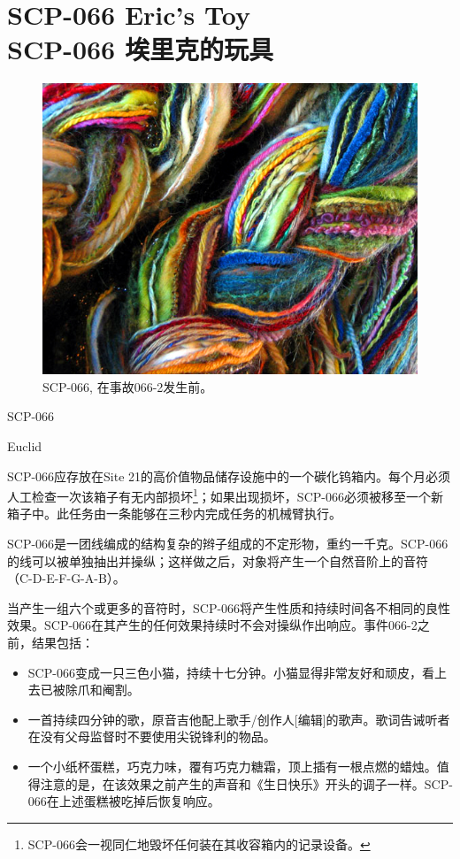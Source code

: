 \chapter[SCP-066 埃里克的玩具]{
    SCP-066 Eric's Toy\\
    SCP-066 埃里克的玩具
}

\label{chap:SCP-066}

\begin{figure}[H]
    \centering
    \includegraphics[width=0.5\linewidth]{images/SCP.066.jpg}
    \caption*{SCP-066, 在事故066-2发生前。}
\end{figure}

SCP-066

 Euclid


SCP-066应存放在Site 21的高价值物品储存设施中的一个碳化钨箱内。每个月必须人工检查一次该箱子有无内部损坏\footnote{SCP-066会一视同仁地毁坏任何装在其收容箱内的记录设备。}；如果出现损坏，SCP-066必须被移至一个新箱子中。此任务由一条能够在三秒内完成任务的机械臂执行。

SCP-066是一团线编成的结构复杂的辫子组成的不定形物，重约一千克。SCP-066的线可以被单独抽出并操纵；这样做之后，对象将产生一个自然音阶上的音符（C-D-E-F-G-A-B）。

当产生一组六个或更多的音符时，SCP-066将产生性质和持续时间各不相同的良性效果。SCP-066在其产生的任何效果持续时不会对操纵作出响应。事件066-2之前，结果包括：

\begin{itemize}
\item SCP-066变成一只三色小猫，持续十七分钟。小猫显得非常友好和顽皮，看上去已被除爪和阉割。
\item 一首持续四分钟的歌，原音吉他配上歌手\slash 创作人{[}编辑]的歌声。歌词告诫听者在没有父母监督时不要使用尖锐锋利的物品。
\item 一个小纸杯蛋糕，巧克力味，覆有巧克力糖霜，顶上插有一根点燃的蜡烛。值得注意的是，在该效果之前产生的声音和《生日快乐》开头的调子一样。SCP-066在上述蛋糕被吃掉后恢复响应。
\end{itemize}

